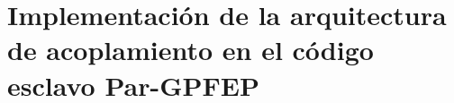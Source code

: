 \chapter{Implementación de la arquitectura de acoplamiento en el código esclavo \textbf{Par-GPFEP}}
\label{C:pargpfep}
